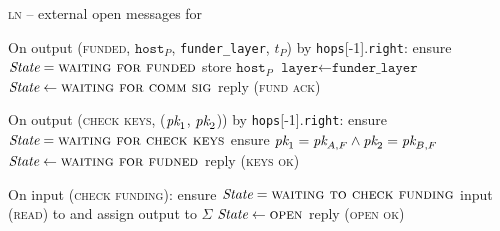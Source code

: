 \begin{center}
  \begin{processbox}{\textsc{ln} -- external open messages for \bob}
    \begin{algorithmic}[1]
      \State On output (\textsc{funded}, $\texttt{host}_P$,
      \texttt{funder\_layer}, $t_P$) by \texttt{hops}[-1].\texttt{right}:
      \label{code:ln:bob:funded}
      \Indent
        \State ensure $\itistate = \textsc{waiting for funded}$
        \State store $\texttt{host}_P$ 
        \label{code:ln:bob:host}
        \State $\texttt{layer} \gets \texttt{funder\_layer}$
        \State $\itistate \gets \textsc{waiting for comm sig}$
        \State reply (\textsc{fund ack})
      \EndIndent
      \Statex

      \State On output (\textsc{check keys}, ($\textit{pk}_{1}$, $\textit{pk}_{2}$)) by
      \texttt{hops}[-1].\texttt{right}:
      \Indent
        \State ensure $\itistate = \textsc{waiting for check keys}$
        \State ensure $\textit{pk}_{1} = \textit{pk}_{A, F} \wedge \textit{pk}_{2} = \textit{pk}_{B, F}$
        \State $\itistate \gets \textsc{waiting for fudned}$
        \State reply (\textsc{keys ok})
      \EndIndent
      \Statex

      \State On input (\textsc{check funding}):
      \Indent
        \State ensure $\itistate = \textsc{waiting to check funding}$
        \State input (\textsc{read}) to \ledger and assign output to $\Sigma$
          \State $\itistate \gets \textsc{open}$
          \label{code:ln:bob:state-open}
          \State reply (\textsc{open ok})
        \EndIf
      \EndIndent
    \end{algorithmic}
  \end{processbox}
  \label{code:ln:bob}
\end{center} \ \\

